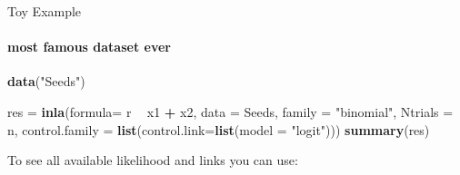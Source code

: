 \documentclass[9pt,ignorenonframetext,]{beamer}
\newenvironment{Shaded}{\begin{snugshade}}{\end{snugshade}}
\newcommand{\DataTypeTok}[1]{\textcolor[rgb]{0.13,0.29,0.53}{#1}}
\newcommand{\KeywordTok}[1]{\textcolor[rgb]{0.13,0.29,0.53}{\textbf{#1}}}
\newcommand{\NormalTok}[1]{#1}
\newcommand{\OperatorTok}[1]{\textcolor[rgb]{0.81,0.36,0.00}{\textbf{#1}}}
\newcommand{\StringTok}[1]{\textcolor[rgb]{0.31,0.60,0.02}{#1}}
\begin{document}
\begin{frame}[fragile]{Toy Example}
\protect\hypertarget{toy-example-2}{}

\framesubtitle{most famous dataset ever}

\begin{Shaded}
\begin{Highlighting}[]
\KeywordTok{data}\NormalTok{(}\StringTok{"Seeds"}\NormalTok{)}

\NormalTok{res =}\StringTok{ }\KeywordTok{inla}\NormalTok{(}\DataTypeTok{formula=}\NormalTok{ r }\OperatorTok{~}\StringTok{ }\NormalTok{x1 }\OperatorTok{+}\StringTok{ }\NormalTok{x2, }\DataTypeTok{data =}\NormalTok{ Seeds,}
           \DataTypeTok{family =} \StringTok{"binomial"}\NormalTok{, }\DataTypeTok{Ntrials =}\NormalTok{ n,}
           \DataTypeTok{control.family =} \KeywordTok{list}\NormalTok{(}\DataTypeTok{control.link=}\KeywordTok{list}\NormalTok{(}\DataTypeTok{model =} \StringTok{"logit"}\NormalTok{)))}
\KeywordTok{summary}\NormalTok{(res)}
\end{Highlighting}
\end{Shaded}

\vspace{0.75cm}

To see all available likelihood and links you can use:

\begin{Shaded}
\end{Shaded}

\end{frame}
\end{document}
